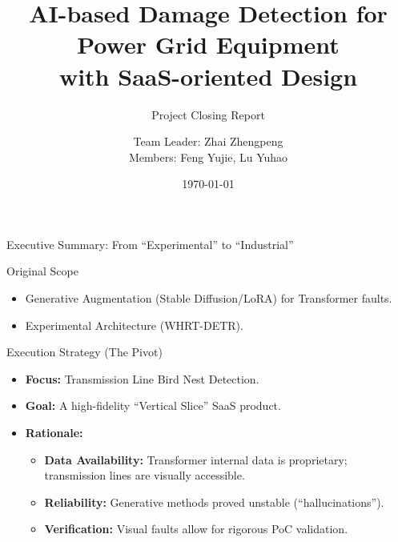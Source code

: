 \documentclass{beamer}
\title[Project Closing Report]{AI-based Damage Detection for Power Grid Equipment \\ with SaaS-oriented Design}
\subtitle{Project Closing Report}
\author[Team Leader: Zhai Zhengpeng]{Team Leader: Zhai Zhengpeng \\ Members: Feng Yujie, Lu Yuhao}
\institute[SWJTU-Leeds]{SWJTU-Leeds Joint School \\ Southwest Jiaotong University}
\date{\today}
\begin{document}
\begin{frame}
    \titlepage
\end{frame}

\begin{frame}{Executive Summary: From ``Experimental'' to ``Industrial''}
    \begin{block}{Original Scope}
        \begin{itemize}
            \item Generative Augmentation (Stable Diffusion/LoRA) for Transformer faults.
            \item Experimental Architecture (WHRT-DETR).
        \end{itemize}
    \end{block}

    \begin{block}{Execution Strategy (The Pivot)}
        \begin{itemize}
            \item \textbf{Focus:} Transmission Line Bird Nest Detection.
            \item \textbf{Goal:} A high-fidelity ``Vertical Slice'' SaaS product.
            \item \textbf{Rationale:}
                \begin{itemize}
                    \item \textbf{Data Availability:} Transformer internal data is proprietary; transmission lines are visually accessible.
                    \item \textbf{Reliability:} Generative methods proved unstable (``hallucinations'').
                    \item \textbf{Verification:} Visual faults allow for rigorous PoC validation.
                \end{itemize}
        \end{itemize}
    \end{block}
\end{frame}
\end{document}
